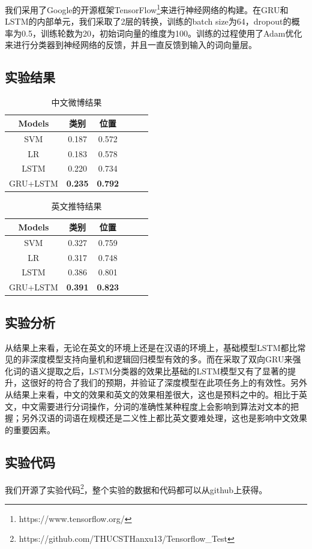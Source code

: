 \documentclass[10pt, titlepage]{article}
\begin{document}
我们采用了Google的开源框架TensorFlow\footnote{https://www.tensorflow.org/}来进行神经网络的构建。在GRU和LSTM的内部单元，我们采取了2层的转换，训练的batch size为64，dropout的概率为0.5，训练轮数为20，初始词向量的维度为100。训练的过程使用了Adam优化来进行分类器到神经网络的反馈，并且一直反馈到输入的词向量层。

\subsection{实验结果}


\begin{table}[htb]
\centering
\small
\begin{tabular}{|c|c|c|c|c|c|}
\hline
Models 		& \textbf{类别} & \textbf{位置}	\\ \hline
SVM			& 0.187           & 0.572		\\ \hline
LR			& 0.183           & 0.578		\\ \hline
LSTM		& 0.220           & 0.734		\\ \hline
GRU+LSTM	& \textbf{0.235}           & \textbf{0.792}		\\ \hline
\end{tabular}
\caption{中文微博结果}
\label{tab:Weibo}
\end{table}


\begin{table}[htb]
\centering
\small
\begin{tabular}{|c|c|c|c|c|c|}
\hline
Models 		& \textbf{类别} & \textbf{位置}	\\ \hline
SVM			& 0.327           & 0.759		\\ \hline
LR			& 0.317           & 0.748		\\ \hline
LSTM		& 0.386           & 0.801		\\ \hline
GRU+LSTM	& \textbf{0.391}           & \textbf{0.823}		\\ \hline
\end{tabular}
\caption{英文推特结果}
\label{tab:Twitter}
\end{table}


\subsection{实验分析}

从结果上来看，无论在英文的环境上还是在汉语的环境上，基础模型LSTM都比常见的非深度模型支持向量机和逻辑回归模型有效的多。而在采取了双向GRU来强化词的语义提取之后，LSTM分类器的效果比基础的LSTM模型又有了显著的提升，这很好的符合了我们的预期，并验证了深度模型在此项任务上的有效性。另外从结果上来看，中文的效果和英文的效果相差很大，这也是预料之中的。相比于英文，中文需要进行分词操作，分词的准确性某种程度上会影响到算法对文本的把握；另外汉语的词语在规模还是二义性上都比英文要难处理，这也是影响中文效果的重要因素。

\subsection{实验代码}

我们开源了实验代码\footnote{https://github.com/THUCSTHanxu13/Tensorflow_Test}，整个实验的数据和代码都可以从github上获得。









\end{document}
